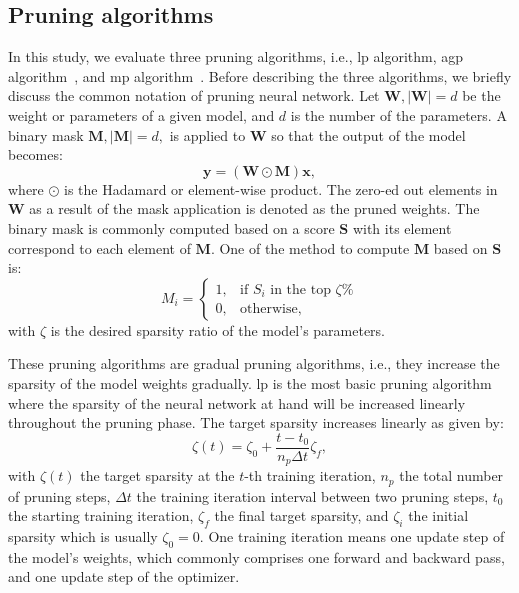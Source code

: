 \documentclass[mathematics,article,submit,pdftex,moreauthors]{Definitions/mdpi}
\renewcommand{\vec}[1]{\bm{#1}}
\begin{document}
\subsection{Pruning algorithms}
In this study, we evaluate three pruning algorithms, i.e., 
\ac{lp} algorithm, \ac{agp} algorithm~\cite{Han2017},
and \ac{mp} algorithm~\cite{Sanh2020}. Before
describing the three algorithms, we briefly discuss
the common notation of pruning neural network. 
Let $\vec{W}, |\vec{W}|=d$ be
the weight or parameters of a given model,
and $d$ is the number of the parameters. A
binary mask $\vec{M}, |\vec{M}|=d,$
is applied to $\vec{W}$ so that the output of
the model becomes:
\begin{equation}
    \vec{y} = (\vec{W} \odot \vec{M})\vec{x}, 
\end{equation}
where $\odot$ is the Hadamard or element-wise product.
The zero-ed out elements in $\vec{W}$ as a result
of the mask application is denoted
as the pruned weights. The binary mask 
is commonly computed based on a score $\vec{S}$
with its element correspond to each element of $\vec{M}$.
One of the method to compute $\vec{M}$ based on $\vec{S}$
is:
\begin{equation}
    M_i = \begin{cases}
        1, &\text{if } S_i \text{ in the top } \zeta\% \\
        0, &\text{otherwise,}
    \end{cases}
\end{equation}
with  $\zeta$ is the desired sparsity ratio of the model's
parameters.


These pruning algorithms
are gradual pruning algorithms, i.e., 
they increase the sparsity of the model weights gradually.
\ac{lp} is the most basic pruning algorithm where the
sparsity of the neural network at hand will be increased
linearly throughout the pruning phase.
The target sparsity increases linearly as given by:
\begin{equation}
    \zeta(t) = \zeta_0 + \frac{t-t_0}{n_p \Delta t} \zeta_f,
\end{equation}
with $\zeta(t)$ the target sparsity at the $t$-th 
training iteration, $n_p$ the total number of pruning steps, 
$\Delta t$ the training iteration interval between
two pruning steps, $t_0$ the starting training iteration,
 $\zeta_f$ the final target sparsity, and $\zeta_i$ the initial
sparsity which is usually $\zeta_0=0$.
One training iteration means one update step of the model's weights,
which commonly comprises one forward and backward pass, and 
one update step of the optimizer. 
\end{document}
